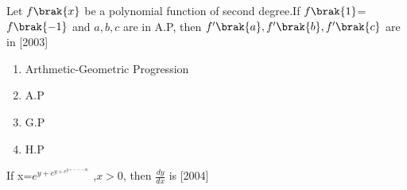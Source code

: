 
\iffalse
  \title{Differentiation}
  \author{Suraj Kolluru}
  \section{mains}
\fi

\item Let $f\brak{x}$ be a polynomial function of second degree.If $f\brak{1}$=$f\brak{-1}$ and $a,b,c$ are in A.P, then $f^{\prime} \brak{a},f^{\prime}\brak{b},f^{\prime}\brak{c}$ are in
    \hfill[2003]
    \begin{enumerate}
    \item Arthmetic-Geometric Progression
    \item A.P
    \item G.P
    \item H.P
    
    \end{enumerate}
    \item If x=$e^{y+e^{y+e^{y+---\infty}}}$ ,$x>0$, then $\frac{dy}{dx}$ is
    \hfill[2004]
    
